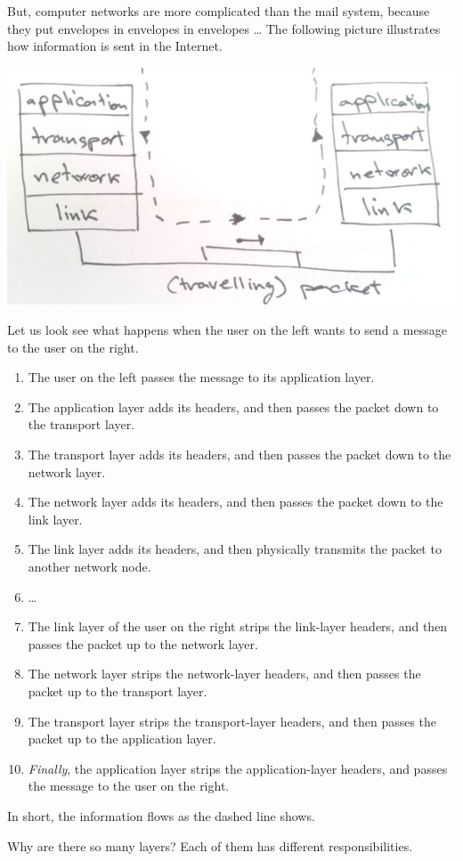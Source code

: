 But, computer networks are more complicated than the mail system,
  because they put envelopes in envelopes in envelopes \dots
The following picture illustrates how information is sent in the Internet.
\begin{center}
\includegraphics[width=.6\textwidth]{network-layers.jpg}
\end{center}
Let us look see what happens
  when the user on the left wants to send a message to the user on the right.
\begin{enumerate}
\item
  The user on the left passes the message to its application layer.
\item
  The application layer adds its headers,
    and then passes the packet down to the transport layer.
\item
  The transport layer adds its headers,
    and then passes the packet down to the network layer.
\item
  The network layer adds its headers,
    and then passes the packet down to the link layer.
\item
  The link layer adds its headers,
    and then physically transmits the packet to another network node.
\item \dots
\item
  The link layer of the user on the right strips the link-layer headers,
    and then passes the packet up to the network layer.
\item
  The network layer strips the network-layer headers,
    and then passes the packet up to the transport layer.
\item
  The transport layer strips the transport-layer headers,
    and then passes the packet up to the application layer.
\item
  \emph{Finally}, the application layer strips the application-layer headers,
    and passes the message to the user on the right.
\end{enumerate}
In short, the information flows as the dashed line shows.

Why are there so many layers?
Each of them has different responsibilities.

